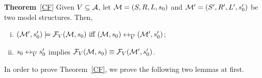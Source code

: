 \documentclass[letterpaper]{article} %
\begin{document}


\noindent\textbf{Theorem}~\ref{CF}
Given $V\subseteq {\cal A}$, let ${\cal M}=(S,R,L,s_0)$  and ${\cal M}'=(S',R', L',s_0')$ be two model structures. Then,
\begin{enumerate}[(i)]
\item  $({\cal M}',s_0') \models {\cal F}_V({\cal M},s_0)
\text{ iff } ({\cal M},s_0) \leftrightarrow_{\overline V} ({\cal M}',s_0')$;

\item  $s_0 \leftrightarrow_{\overline V} s_0'$ implies  ${\cal F}_V({\cal M}, s_0) \equiv {\cal F}_V({\cal M}', s_0')$.

\end{enumerate}

In order to prove Theorem~\ref{CF}, we prove the following two lemmas at first.
\end{document}
